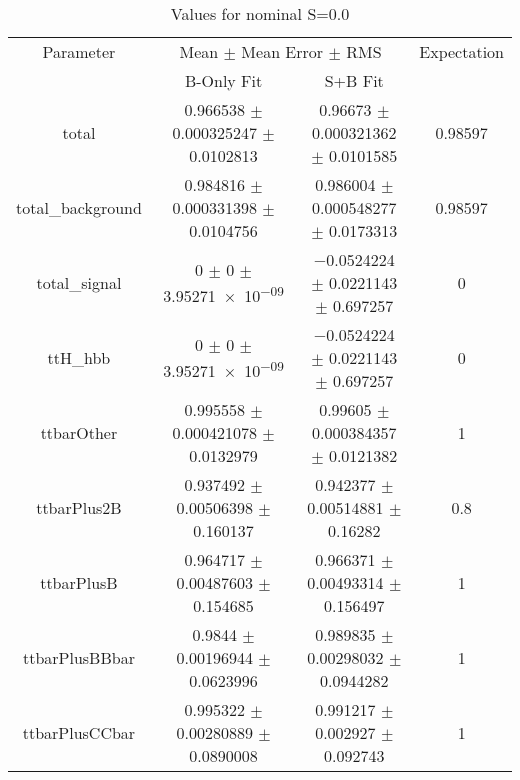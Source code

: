 \begin{table}
\centering
\caption{Values for nominal S=0.0}
\begin{tabular}{cccc}
\toprule
Parameter & \multicolumn{2}{c}{Mean $\pm$ Mean Error $\pm$ RMS} & Expectation\\
 & B-Only Fit & S+B Fit & \\
\midrule
total & \num{0.966538} $\pm$ \num{0.000325247} $\pm$ \num{0.0102813} & \num{0.96673} $\pm$ \num{0.000321362} $\pm$ \num{0.0101585} & \num{0.98597}\\
total\_background & \num{0.984816} $\pm$ \num{0.000331398} $\pm$ \num{0.0104756} & \num{0.986004} $\pm$ \num{0.000548277} $\pm$ \num{0.0173313} & \num{0.98597}\\
total\_signal & \num{0} $\pm$ \num{0} $\pm$ \num{3.95271e-09} & \num{-0.0524224} $\pm$ \num{0.0221143} $\pm$ \num{0.697257} & \num{0}\\
ttH\_hbb & \num{0} $\pm$ \num{0} $\pm$ \num{3.95271e-09} & \num{-0.0524224} $\pm$ \num{0.0221143} $\pm$ \num{0.697257} & \num{0}\\
ttbarOther & \num{0.995558} $\pm$ \num{0.000421078} $\pm$ \num{0.0132979} & \num{0.99605} $\pm$ \num{0.000384357} $\pm$ \num{0.0121382} & \num{1}\\
ttbarPlus2B & \num{0.937492} $\pm$ \num{0.00506398} $\pm$ \num{0.160137} & \num{0.942377} $\pm$ \num{0.00514881} $\pm$ \num{0.16282} & \num{0.8}\\
ttbarPlusB & \num{0.964717} $\pm$ \num{0.00487603} $\pm$ \num{0.154685} & \num{0.966371} $\pm$ \num{0.00493314} $\pm$ \num{0.156497} & \num{1}\\
ttbarPlusBBbar & \num{0.9844} $\pm$ \num{0.00196944} $\pm$ \num{0.0623996} & \num{0.989835} $\pm$ \num{0.00298032} $\pm$ \num{0.0944282} & \num{1}\\
ttbarPlusCCbar & \num{0.995322} $\pm$ \num{0.00280889} $\pm$ \num{0.0890008} & \num{0.991217} $\pm$ \num{0.002927} $\pm$ \num{0.092743} & \num{1}\\
\bottomrule
\end{tabular}
\end{table}